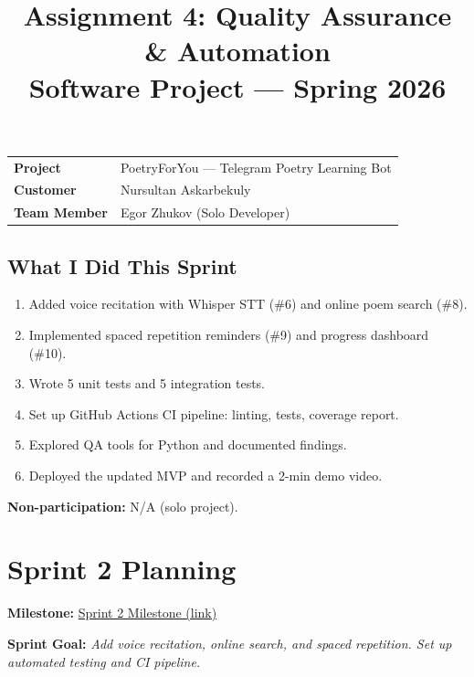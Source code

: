 \documentclass[11pt, a4paper]{article}
\title{\textbf{Assignment 4: Quality Assurance \& Automation}\\[0.5em]
\large Software Project --- Spring 2026}
\author{}
\date{}
\begin{document}
\maketitle
\thispagestyle{empty}

\begin{center}
\begin{tabular}{ll}
\toprule
\textbf{Project} & PoetryForYou --- Telegram Poetry Learning Bot \\
\textbf{Customer} & Nursultan Askarbekuly \\
\textbf{Team Member} & Egor Zhukov (Solo Developer) \\
\bottomrule
\end{tabular}
\end{center}

\subsection*{What I Did This Sprint}
\begin{enumerate}
    \item Added voice recitation with Whisper STT (\#6) and online poem search (\#8).
    \item Implemented spaced repetition reminders (\#9) and progress dashboard (\#10).
    \item Wrote 5 unit tests and 5 integration tests.
    \item Set up GitHub Actions CI pipeline: linting, tests, coverage report.
    \item Explored QA tools for Python and documented findings.
    \item Deployed the updated MVP and recorded a 2-min demo video.
\end{enumerate}

\textbf{Non-participation:} N/A (solo project).


\section{Sprint 2 Planning}

\textbf{Milestone:} \href{https://github.com/d13-l1t3/PoetryForYou/milestone/2}{Sprint 2 Milestone (link)}

\textbf{Sprint Goal:} \textit{Add voice recitation, online search, and spaced repetition. Set up automated testing and CI pipeline.}
\end{document}
